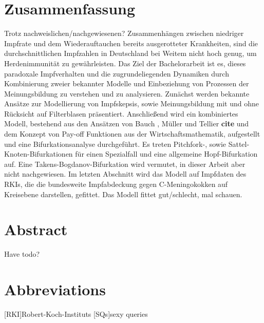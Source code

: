 \documentclass[12pt,a4paper,twoside]{article}
\begin{document}
\newpage
\section*{Zusammenfassung}
Trotz nachweislichen/nachgewiesenen? Zusammenhängen zwischen niedriger Impfrate und dem Wiederauftauchen bereits ausgerotteter Krankheiten, sind die durchschnittlichen Impfzahlen in Deutschland bei Weitem nicht hoch genug, um Herdenimmunität zu gewährleisten. Das Ziel der Bachelorarbeit ist es, dieses paradoxale Impfverhalten und die zugrundeliegenden Dynamiken durch Kombinierung zweier bekannter Modelle und Einbeziehung von Prozessen der Meinungsbildung zu verstehen und zu analysieren. Zunächst werden bekannte Ansätze zur Modellierung von Impfskepsis, sowie Meinungsbildung mit und ohne Rücksicht auf Filterblasen präsentiert. Anschließend wird ein kombiniertes Modell, bestehend aus den Ansätzen von Bauch \cite{Bauch2012}, Müller und Tellier \textbf{cite} und dem Konzept von Pay-off Funktionen aus der Wirtschaftsmathematik, aufgestellt und eine Bifurkationsanalyse durchgeführt. Es treten Pitchfork-, sowie Sattel-Knoten-Bifurkationen für einen Spezialfall und eine allgemeine Hopf-Bifurkation auf. Eine Takens-Bogdanov-Bifurkation wird vermutet, in dieser Arbeit aber nicht nachgewiesen. Im letzten Abschnitt wird das Modell auf Impfdaten des \acfp{RKI}, die die bundesweite Impfabdeckung gegen C-Meningokokken auf Kreisebene darstellen, gefittet. Das Modell fittet gut/schlecht, mal schauen.

\section*{Abstract}
Have todo?
\newpage
\tableofcontents
\newpage

\pagestyle{headings}

\newpage


\section*{Abbreviations}

\begin{acronym}[STIKO]%
	[RKI]{Robert-Koch-Instituts}
	[SQs]{sexy queries}
\end{acronym}
\end{document}
